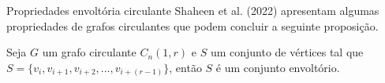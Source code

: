 

\begin{frame}{Propriedades envoltória circulante}
      Shaheen et al. (2022) apresentam algumas propriedades de grafos circulantes que podem concluir a seguinte proposição.
      \begin{proposition}
            \label{prop-circulante-p3}
            Seja $G$ um grafo circulante $C_n(1,r)$ e $S$ um conjunto de vértices tal que $S=\{v_i,v_{i+1},v_{i+2},...,v_{i+(r-1)}\}$, então $S$ é um conjunto envoltório.
      \end{proposition}
\end{frame}

